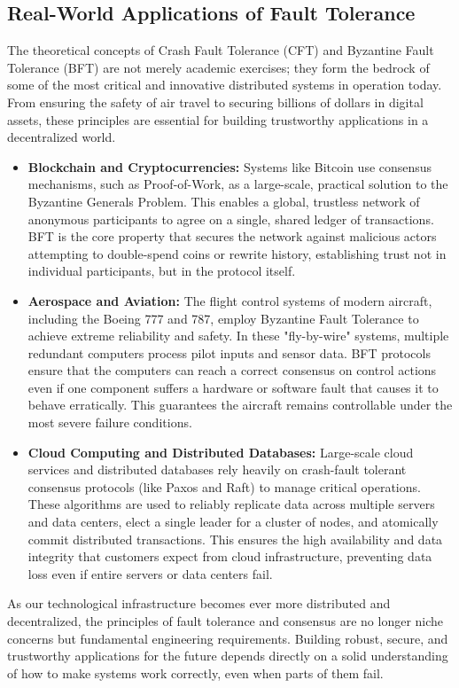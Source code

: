 \documentclass{scrbook}
\begin{document}
\subsection{Real-World Applications of Fault Tolerance}

The theoretical concepts of Crash Fault Tolerance (CFT) and Byzantine
Fault Tolerance (BFT) are not merely academic exercises; they form the
bedrock of some of the most critical and innovative distributed systems
in operation today. From ensuring the safety of air travel to securing
billions of dollars in digital assets, these principles are essential
for building trustworthy applications in a decentralized world.

\begin{itemize}
\item
  \textbf{Blockchain and Cryptocurrencies:} Systems like Bitcoin use
  consensus mechanisms, such as Proof-of-Work, as a large-scale,
  practical solution to the Byzantine Generals Problem. This enables a
  global, trustless network of anonymous participants to agree on a
  single, shared ledger of transactions. BFT is the core property that
  secures the network against malicious actors attempting to
  double-spend coins or rewrite history, establishing trust not in
  individual participants, but in the protocol itself.
\item
  \textbf{Aerospace and Aviation:} The flight control systems of modern
  aircraft, including the Boeing 777 and 787, employ Byzantine Fault
  Tolerance to achieve extreme reliability and safety. In these
  "fly-by-wire" systems, multiple redundant computers process pilot
  inputs and sensor data. BFT protocols ensure that the computers can
  reach a correct consensus on control actions even if one component
  suffers a hardware or software fault that causes it to behave
  erratically. This guarantees the aircraft remains controllable under
  the most severe failure conditions.
\item
  \textbf{Cloud Computing and Distributed Databases:} Large-scale cloud
  services and distributed databases rely heavily on crash-fault
  tolerant consensus protocols (like Paxos and Raft) to manage critical
  operations. These algorithms are used to reliably replicate data
  across multiple servers and data centers, elect a single leader for a
  cluster of nodes, and atomically commit distributed transactions. This
  ensures the high availability and data integrity that customers expect
  from cloud infrastructure, preventing data loss even if entire servers
  or data centers fail.
\end{itemize}

As our technological infrastructure becomes ever more distributed and
decentralized, the principles of fault tolerance and consensus are no
longer niche concerns but fundamental engineering requirements. Building
robust, secure, and trustworthy applications for the future depends
directly on a solid understanding of how to make systems work correctly,
even when parts of them fail.
\end{document}
